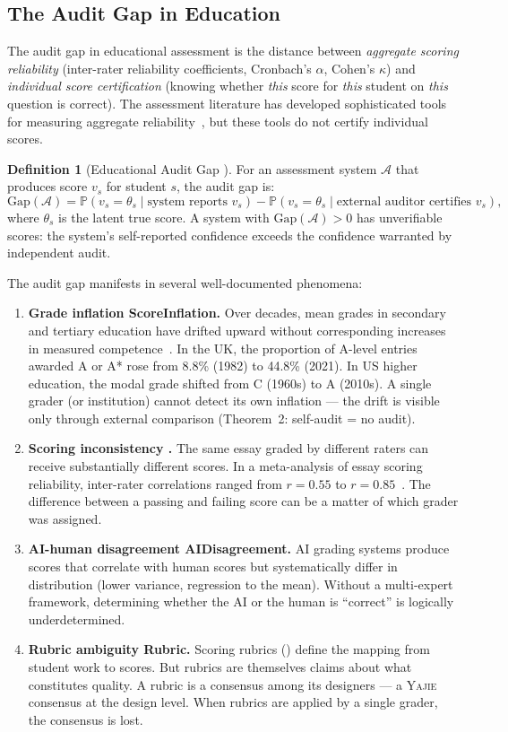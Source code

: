 \documentclass[11pt,a4paper]{article}
\theoremstyle{definition}
\newtheorem{definition}[theorem]{Definition}
\theoremstyle{remark}
\newcommand{\Yajie}{\textsc{Yajie}}
\newcommand{\Pbb}{\mathbb{P}}
\newcommand{\cA}{\mathcal{A}}
\newcommand{\cR}{\mathcal{R}}
\newcommand{\rubric}{\cR}
\newcommand{\trueScore}{\theta}
\begin{document}
\subsection{The Audit Gap in Education}
The audit gap in educational assessment is the distance between \textit{aggregate scoring reliability} (inter-rater reliability coefficients, Cronbach's $\alpha$, Cohen's $\kappa$) and \textit{individual score certification} (knowing whether \textit{this} score for \textit{this} student on \textit{this} question is correct). The assessment literature has developed sophisticated tools for measuring aggregate reliability~\cite{Brennan2001, Haertel2006}, but these tools do not certify individual scores.
\begin{definition}[Educational Audit Gap ]
\label{def:audit_gap}
For an assessment system $\cA$ that produces score $v_s$ for student $s$, the audit gap is:
\begin{equation}
    \text{Gap}(\cA) = \Pbb(v_s = \trueScore_s \mid \text{system reports } v_s) - \Pbb(v_s = \trueScore_s \mid \text{external auditor certifies } v_s),
\end{equation}
where $\trueScore_s$ is the latent true score. A system with $\text{Gap}(\cA) > 0$ has unverifiable scores: the system's self-reported confidence exceeds the confidence warranted by independent audit.
\end{definition}
The audit gap manifests in several well-documented phenomena:
\begin{enumerate}[label=(\roman*)]
    \item \textbf{Grade inflation ScoreInflation.} Over decades, mean grades in secondary and tertiary education have drifted upward without corresponding increases in measured competence~\cite{Johnson2003, RojstaczerHealy2012}. In the UK, the proportion of A-level entries awarded A or A* rose from 8.8\% (1982) to 44.8\% (2021). In US higher education, the modal grade shifted from C (1960s) to A (2010s). A single grader (or institution) cannot detect its own inflation — the drift is visible only through external comparison (Theorem~2: self-audit = no audit).
    \item \textbf{Scoring inconsistency .} The same essay graded by different raters can receive substantially different scores. In a meta-analysis of essay scoring reliability, inter-rater correlations ranged from $r = 0.55$ to $r = 0.85$~\cite{MeadowsBillington2005}. The difference between a passing and failing score can be a matter of which grader was assigned.
    \item \textbf{AI-human disagreement AIDisagreement.} AI grading systems produce scores that correlate with human scores but systematically differ in distribution (lower variance, regression to the mean). Without a multi-expert framework, determining whether the AI or the human is ``correct'' is logically underdetermined.
    \item \textbf{Rubric ambiguity Rubric.} Scoring rubrics (\rubric) define the mapping from student work to scores. But rubrics are themselves claims about what constitutes quality. A rubric is a consensus among its designers — a \Yajie{} consensus at the design level. When rubrics are applied by a single grader, the consensus is lost.
\end{enumerate}
\end{document}
